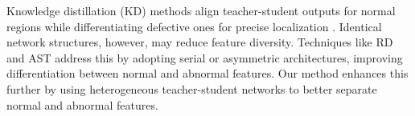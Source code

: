 Knowledge distillation (KD) methods align teacher-student outputs for normal regions while differentiating defective ones for precise localization \cite{(29)salehi2021multiresolution}. 
Identical network structures, however, may reduce feature diversity. Techniques like RD \cite{(30)deng2022anomaly} and AST \cite{(31)rudolph2023asymmetric} address this by adopting serial or asymmetric architectures, improving differentiation between normal and abnormal features. Our method enhances this further by using heterogeneous teacher-student networks to better separate normal and abnormal features.